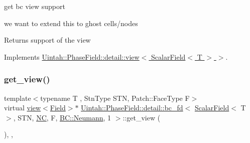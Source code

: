 get bc view support 

we want to extend this to ghost cells/nodes

\begin{DoxyReturn}{Returns}
support of the view 
\end{DoxyReturn}


Implements \hyperlink{classUintah_1_1PhaseField_1_1detail_1_1view_3_01ScalarField_3_01T_01_4_01_4_a3e14b0c7a57a57707bb33954861ab1c1}{Uintah\+::\+Phase\+Field\+::detail\+::view$<$ Scalar\+Field$<$ T $>$ $>$}.

\mbox{\label{classUintah_1_1PhaseField_1_1detail_1_1bc__fd_3_01ScalarField_3_01T_01_4_00_01STN_00_01NC_00_01F_00_01BC_1_1Neumann_00_011_01_4_acd326fe71c0df45ad7fccd480a29da8e}} 
\subsubsection{\texorpdfstring{get\+\_\+view()}{get\_view()}\hspace{0.1cm}{\footnotesize\ttfamily [1/2]}}
{\footnotesize\ttfamily template$<$typename T , Stn\+Type S\+TN, Patch\+::\+Face\+Type F$>$ \\
virtual \hyperlink{classUintah_1_1PhaseField_1_1detail_1_1view}{view}$<$\hyperlink{structUintah_1_1PhaseField_1_1ScalarField}{Field}$>$$\ast$ \hyperlink{classUintah_1_1PhaseField_1_1detail_1_1bc__fd}{Uintah\+::\+Phase\+Field\+::detail\+::bc\+\_\+fd}$<$ \hyperlink{structUintah_1_1PhaseField_1_1ScalarField}{Scalar\+Field}$<$ T $>$, S\+TN, \hyperlink{namespaceUintah_1_1PhaseField_a33d355affda78a83f45755ba8388cedda77924170fe82bfd58b74ca3e44139718}{NC}, F, \hyperlink{namespaceUintah_1_1PhaseField_a148fba372aa3be96fd6eede7a2fa10b5ab8537a769dbc90cb1762215441212152}{B\+C\+::\+Neumann}, 1 $>$\+::get\+\_\+view (\begin{DoxyParamCaption}{ }\end{DoxyParamCaption})\hspace{0.3cm}{\ttfamily [inline]}, {\ttfamily [override]}, {\ttfamily [virtual]}}



